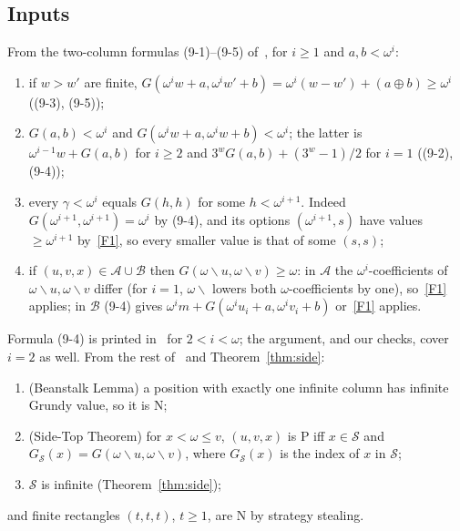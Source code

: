 \documentclass[11pt]{amsart}
\theoremstyle{definition}
\theoremstyle{remark}
\newcommand{\Sc}{\mathcal{S}}
\newcommand{\A}{\mathcal{A}}
\newcommand{\B}{\mathcal{B}}
\newcommand{\G}{G}
\newcommand{\GS}{G_{\Sc}}
\newcommand{\nim}{\oplus}
\newcommand{\ldiv}{\mathbin{\backslash}}
\begin{document}
\subsection{Inputs}
From the two-column formulas (9-1)--(9-5) of~\cite{HS}, for $i\ge1$ and $a,b<\omega^i$:
\begin{enumerate}[label=(F\arabic*)]
\item\label{F1} if $w>w'$ are finite, $\G(\omega^iw+a,\omega^iw'+b)=\omega^i(w-w')+(a\nim b)\ge\omega^i$
  ((9-3), (9-5));
\item\label{F2} $\G(a,b)<\omega^i$ and $\G(\omega^iw+a,\omega^iw+b)<\omega^i$; the latter is
  $\omega^{i-1}w+\G(a,b)$ for $i\ge2$ and $3^w\G(a,b)+(3^w-1)/2$ for $i=1$ ((9-2), (9-4));
\item\label{F3} every $\gamma<\omega^i$ equals $\G(h,h)$ for some $h<\omega^{i+1}$. Indeed
  $\G(\omega^{i+1},\omega^{i+1})=\omega^i$ by (9-4), and its options $(\omega^{i+1},s)$ have
  values $\ge\omega^{i+1}$ by~\ref{F1}, so every smaller value is that of some $(s,s)$;
\item\label{F4} if $(u,v,x)\in\A\cup\B$ then $\G(\omega\ldiv u,\omega\ldiv v)\ge\omega$: in $\A$ the
  $\omega^i$-coefficients of $\omega\ldiv u,\omega\ldiv v$ differ (for $i=1$, $\omega\ldiv$ lowers
  both $\omega$-coefficients by one), so~\ref{F1} applies; in $\B$ (9-4) gives
  $\omega^im+\G(\omega^iu_i+a,\omega^iv_i+b)$ or~\ref{F1} applies.
\end{enumerate}
Formula (9-4) is printed in~\cite{HS} for $2<i<\omega$; the argument, and our checks, cover
$i=2$ as well. From the rest of~\cite{HS} and Theorem~\ref{thm:side}:
\begin{enumerate}[label=(\Alph*)]
\item[(BS)] (Beanstalk Lemma) a position with exactly one infinite column has infinite Grundy
  value, so it is N;
\item[(ST)] (Side-Top Theorem) for $x<\omega\le v$, $(u,v,x)$ is P iff $x\in\Sc$ and
  $\GS(x)=\G(\omega\ldiv u,\omega\ldiv v)$, where $\GS(x)$ is the index of $x$ in $\Sc$;
\item[($\Sc\infty$)] $\Sc$ is infinite (Theorem~\ref{thm:side});
\end{enumerate}
and finite rectangles $(t,t,t)$, $t\ge1$, are N by strategy stealing.
\end{document}

